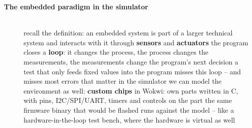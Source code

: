 \begin{description}
\item[{\rot\bf The embedded paradigm in the simulator}]~\\[-\lblskip]
\bi
	\ite recall the definition: an embedded system is part of a larger technical system and interacts with it through \textbf{sensors} and \textbf{actuators}
	\ite the program closes a \textbf{loop}: it changes the process, the process changes the measurements, the measurements change the program's next decision
	\ite a test that only feeds fixed values into the program misses this loop -- and misses most errors that matter
	\ite in the simulator we can model the environment as well:
	\bi
		\ite \textbf{custom chips} in Wokwi: own parts written in C, with pins, I2C/SPI/UART, timers and controls on the part
		\ite the same firmware binary that would be flashed runs against the model -- like a hardware-in-the-loop test bench, where the hardware is virtual as well
	\ei
\ei
\os{\newpage}


\end{description}
